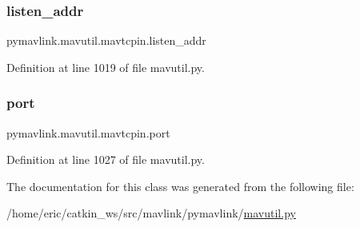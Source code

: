 \subsubsection{\texorpdfstring{listen\_addr}{listen\_addr}}
{\footnotesize\ttfamily pymavlink.\+mavutil.\+mavtcpin.\+listen\+\_\+addr}



Definition at line 1019 of file mavutil.\+py.

\mbox{\label{classpymavlink_1_1mavutil_1_1mavtcpin_a8586f3238dd3f55049b9802821c9ee10}} 
\subsubsection{\texorpdfstring{port}{port}}
{\footnotesize\ttfamily pymavlink.\+mavutil.\+mavtcpin.\+port}



Definition at line 1027 of file mavutil.\+py.



The documentation for this class was generated from the following file\+:\begin{DoxyCompactItemize}
\item 
/home/eric/catkin\+\_\+ws/src/mavlink/pymavlink/\mbox{\hyperlink{mavutil_8py}{mavutil.\+py}}\end{DoxyCompactItemize}
